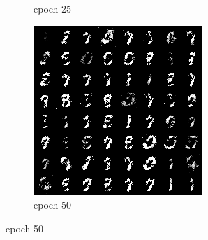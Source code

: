 \documentclass[a4paper]{article}
\theoremstyle{definition}
\newenvironment{soln}{
	\leavevmode\color{blue}\ignorespaces
}{}
\begin{document}
\begin{enumerate} [label=(\alph*)]
\begin{soln}
\begin{figure}[H]
\begin{subfigure}[b]{0.3\textwidth}
					\caption{epoch 25}
				\end{subfigure}
				\hfill
				\begin{subfigure}[b]{0.3\textwidth}
					\centering
					\includegraphics[width=\textwidth]{1c_e50.png}
					\caption{epoch 50}
				\end{subfigure}
				\label{fig:three graphs}
			\end{figure}
			

\end{soln}
\end{enumerate}
\end{document}
